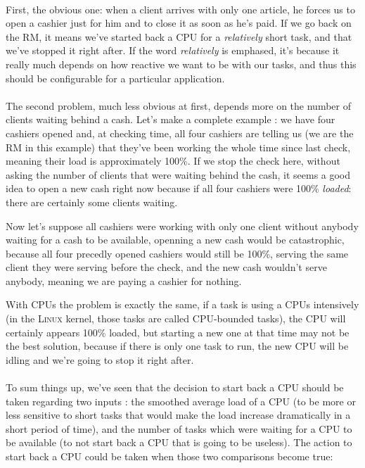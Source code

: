 \documentclass{report}
\begin{document}
\paragraph{}
First, the obvious one: when a client arrives with only one article, he forces
us to open a cashier just for him and to close it as soon as he's paid. If we
go back on the RM, it means we've started back a CPU for a {\em relatively}
short task, and that we've stopped it right after. If the word {\em relatively}
is emphased, it's because it really much depends on how reactive we want to be
with our tasks, and thus this should be configurable for a particular
application.

\paragraph{}
The second problem, much less obvious at first, depends more on the number of
clients waiting behind a cash. Let's make a complete example : we have four
cashiers opened and, at checking time, all four cashiers are telling us (we are
the RM in this example) that they've been working the whole time since last
check, meaning their load is approximately 100\%. If we stop the check here,
without asking the number of clients that were waiting behind the cash, it
seems a good idea to open a new cash right now because if all four cashiers
were 100\% {\it loaded}: there are certainly some clients waiting.

Now let's suppose all cashiers were working with only one client without
anybody waiting for a cash to be available, openning a new cash would be
catastrophic, because all four precedly opened cashiers would still be 100\%,
serving the same client they were serving before the check, and the new cash
wouldn't serve anybody, meaning we are paying a cashier for nothing.

With CPUs the problem is exactly the same, if a task is using a CPUs
intensively (in the \textsc{Linux} kernel, those tasks are called CPU-bounded
tasks), the CPU will certainly appears 100\% loaded, but starting a new one at
that time may not be the best solution, because if there is only one task to
run, the new CPU will be idling and we're going to stop it right after.

\paragraph{}
To sum things up, we've seen that the decision to start back a CPU should be
taken regarding two inputs : the smoothed average load of a CPU (to be more or
less sensitive to short tasks that would make the load increase dramatically in
a short period of time), and the number of tasks which were waiting for a CPU
to be available (to not start back a CPU that is going to be useless). The
action to start back a CPU could be taken when those two comparisons become
true:
\end{document}
